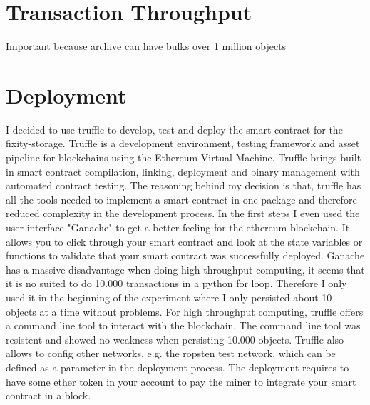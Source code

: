 \section{Transaction Throughput}
Important because archive can have bulks over 1 million objects
\section{Deployment}
I decided to use truffle to develop, test and deploy the smart contract for the fixity-storage. Truffle is a development environment, testing framework and asset pipeline for blockchains using the Ethereum Virtual Machine. Truffle brings built-in smart contract compilation, linking, deployment and binary management with automated contract testing. The reasoning behind my decision is that, truffle has all the tools needed to implement a smart contract in one package and therefore reduced complexity in the development process. In the first steps I even used the user-interface "Ganache" to get a better feeling for the ethereum blockchain. It allows you to click through your smart contract and look at the state variables or functions to validate that your smart contract was successfully deployed. Ganache has a massive disadvantage when doing high throughput computing, it seems that it is no suited to do 10.000 transactions in a python for loop. Therefore I only used it in the beginning of the experiment where I only persisted about 10 objects at a time without problems. For high throughput computing, truffle offers a command line tool to interact with the blockchain. The command line tool was resistent and showed no weakness when persisting 10.000 objects.
Truffle also allows to config other networks, e.g. the ropsten test network, which can be defined as a parameter in the deployment process. The deployment requires to have some ether token in your account to pay the miner to integrate your smart contract in a block. 